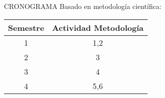 CRONOGRAMA
Basado en metodología científica:
\begin{table}[H]
\centering
\begin{tabular}{|c|c|}
\hline
Semestre & Actividad Metodología \\\hline\hline
1        & 1,2                   \\\hline
2        & 3                     \\\hline
3        & 4                     \\\hline
4        & 5,6\\\hline
\end{tabular}
\end{table}